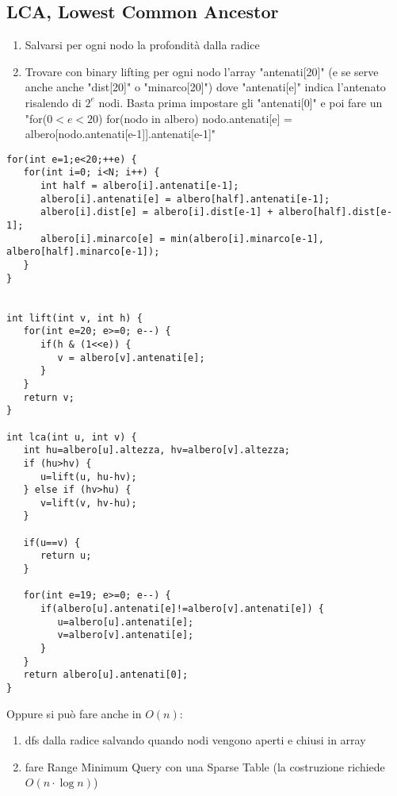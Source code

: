 \documentclass{article}
\begin{document}
\subsection{LCA, Lowest Common Ancestor}
\begin{enumerate}
    \item Salvarsi per ogni nodo la profondità dalla radice
    \item Trovare con binary lifting per ogni nodo l’array "antenati[20]" (e se serve anche anche "dist[20]" o "minarco[20]") dove "antenati[e]" indica l’antenato risalendo di $2^e$ nodi. Basta prima impostare gli "antenati[0]" e poi fare un "for($0<e<20$) for(nodo in albero) nodo.antenati[e] = albero[nodo.antenati[e-1]].antenati[e-1]"
\end{enumerate}
\begin{lstlisting}
for(int e=1;e<20;++e) {
   for(int i=0; i<N; i++) {
      int half = albero[i].antenati[e-1];
      albero[i].antenati[e] = albero[half].antenati[e-1];
      albero[i].dist[e] = albero[i].dist[e-1] + albero[half].dist[e-1];
      albero[i].minarco[e] = min(albero[i].minarco[e-1], albero[half].minarco[e-1]);
   }
}


int lift(int v, int h) {
   for(int e=20; e>=0; e--) {
      if(h & (1<<e)) {
         v = albero[v].antenati[e];
      }
   }
   return v;
}

int lca(int u, int v) {
   int hu=albero[u].altezza, hv=albero[v].altezza;
   if (hu>hv) {
      u=lift(u, hu-hv);
   } else if (hv>hu) {
      v=lift(v, hv-hu);
   }

   if(u==v) {
      return u;
   }

   for(int e=19; e>=0; e--) {
      if(albero[u].antenati[e]!=albero[v].antenati[e]) {
         u=albero[u].antenati[e];
         v=albero[v].antenati[e];
      }
   }
   return albero[u].antenati[0];
}
\end{lstlisting}
Oppure si può fare anche in $O(n)$:
\begin{enumerate}
    \item dfs dalla radice salvando quando nodi vengono aperti e chiusi in array
    \item fare Range Minimum Query con una Sparse Table (la costruzione richiede $O(n\cdot \log n)$)
\end{enumerate}
\end{document}
